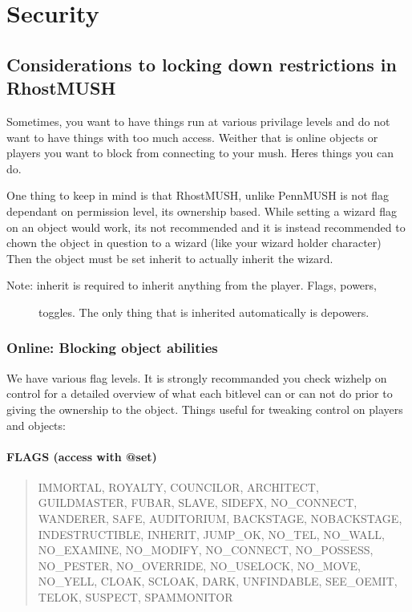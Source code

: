 \documentclass[letterpaper,10pt,english]{sphinxmanual}
\begin{document}
\chapter{Security}
\label{\detokenize{security:security}}\label{\detokenize{security::doc}}

\section{Considerations to locking down restrictions in RhostMUSH}
\label{\detokenize{security:considerations-to-locking-down-restrictions-in-rhostmush}}
\sphinxAtStartPar
Sometimes, you want to have things run at various privilage levels and do not
want to have things with too much access.  Weither that is online objects or
players you want to block from connecting to your mush.  Here\textquotesingle{}s things you can
do.

\sphinxAtStartPar
One thing to keep in mind is that RhostMUSH, unlike PennMUSH is not flag
dependant on permission level, it\textquotesingle{}s ownership based.  While setting a wizard
flag on an object would work, it\textquotesingle{}s not recommended and it is instead recommended
to chown the object in question to a wizard (like your wizard holder character)
Then the object must be set inherit to actually inherit the wizard.
\begin{description}
\item[{Note: inherit is required to inherit anything from the player.  Flags, powers,}] \leavevmode
\sphinxAtStartPar
toggles.  The only thing that is inherited automatically is depowers.

\end{description}


\subsection{Online: Blocking object abilities}
\label{\detokenize{security:online-blocking-object-abilities}}
\sphinxAtStartPar
We have various flag levels.  It is strongly recommanded you check wizhelp
on \textquotesingle{}control\textquotesingle{} for a detailed overview of what each bitlevel can or can not do
prior to giving the ownership to the object.  Things useful for tweaking control
on players and objects:


\subsubsection{FLAGS (access with @set)}
\label{\detokenize{security:flags-access-with-set}}\begin{quote}

\sphinxAtStartPar
IMMORTAL, ROYALTY, COUNCILOR, ARCHITECT, GUILDMASTER,
FUBAR, SLAVE, SIDEFX, NO\_CONNECT, WANDERER, SAFE,
AUDITORIUM, BACKSTAGE, NOBACKSTAGE, INDESTRUCTIBLE,
INHERIT, JUMP\_OK, NO\_TEL, NO\_WALL, NO\_EXAMINE,
NO\_MODIFY, NO\_CONNECT, NO\_POSSESS, NO\_PESTER,
NO\_OVERRIDE, NO\_USELOCK, NO\_MOVE, NO\_YELL, CLOAK,
SCLOAK, DARK, UNFINDABLE, SEE\_OEMIT, TELOK, SUSPECT,
SPAMMONITOR
\end{quote}
\end{document}
